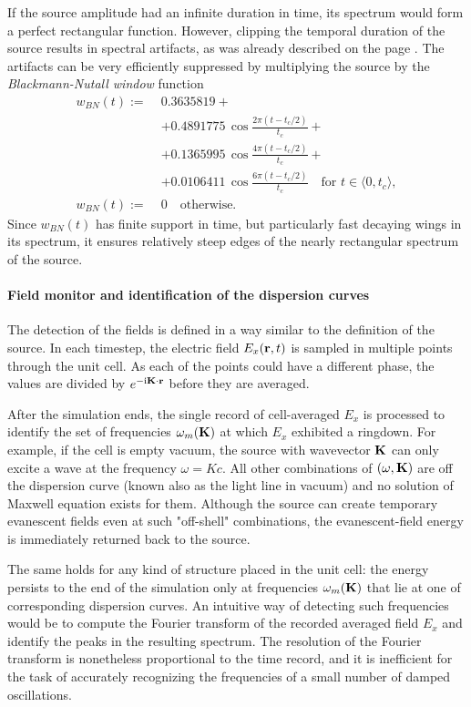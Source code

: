 If the source amplitude had an infinite duration in time, its spectrum would form a perfect rectangular function. However, clipping the temporal duration of the source results in spectral artifacts, as was already described on the page \pageref{convolringing}.
The artifacts can be very efficiently suppressed by multiplying the source by the \textit{Blackmann-Nutall window}  function
\begin{equation} 
\begin{split} 
	w_{BN}(t) :=\; & 0.3635819 + \\
			 &+ 0.4891775\,\cos\frac{2\pi(t-t_c/2)}{t_c} + \\
			&+ 0.1365995\,\cos\frac{4\pi(t-t_c/2)}{t_c} + \\
			&+ 0.0106411\,\cos\frac{6\pi(t-t_c/2)}{t_c} \quad \text{for } t\in\langle0, t_c\rangle, \\
	w_{BN}(t) :=\;& 0 \quad \text{otherwise.}
\end{split} 
\label{eq_wBN}\end{equation} 
Since $w_{BN}(t)$ has finite support in time, but particularly fast decaying wings in its spectrum, it ensures relatively steep edges of the nearly rectangular spectrum of the source.

\paragraph{Field monitor and identification of the dispersion curves}%
The detection of the fields is defined in a way similar to the definition of the source. In each timestep, the electric field $E_x({\mathbf{r}},t)$ is sampled in multiple points through the unit cell. As each of the points could have a different phase, the values are divided by $e^{-{\mathrm i} {\mathbf{K}}\cdot {\mathbf{r}}}$ before they are averaged.

After the simulation ends, the single record of cell-averaged $E_x$ is processed to identify the set of frequencies $\omega_m({\mathbf{K}})$ at which $E_x$ exhibited a ringdown. For example, if the cell is empty vacuum, the source with wavevector ${\mathbf{K}}$ can only excite a wave at the frequency $\omega = Kc$. All other combinations of $(\omega, {\mathbf{K}})$ are off the dispersion curve (known also as the light line in vacuum) and no solution of Maxwell equation exists for them. Although the source can create temporary evanescent fields even at such "off-shell" combinations, the evanescent-field energy is immediately returned back to the source. 

The same holds for any kind of structure placed in the unit cell: the energy persists to the end of the simulation only at frequencies $\omega_m({\mathbf{K}})$ that lie at one of corresponding dispersion curves. An intuitive way of detecting such frequencies would be to compute the Fourier transform of the recorded averaged field $E_x$ and identify the peaks in the resulting spectrum. The resolution of the Fourier transform is nonetheless proportional to the time record, and it is inefficient for the task of accurately recognizing the frequencies of a small number of damped oscillations.

